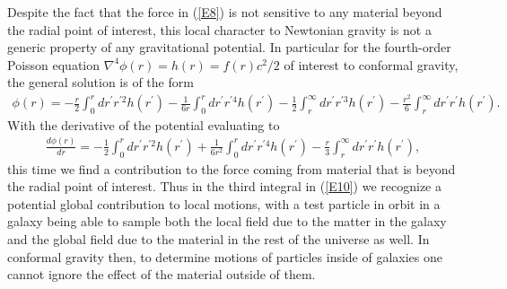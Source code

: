 \documentclass[preprint,aps]{revtex4}
\begin{document}
Despite the fact that the force in (\ref{E8}) is not sensitive to any material beyond the radial point of interest, this local character to Newtonian gravity is not a generic property of any gravitational potential. In particular for the fourth-order Poisson equation $\nabla^4\phi(r)=h(r)=f(r)c^2/2$ of interest to conformal gravity, the general solution is of the form 
%                                                                               
\begin{eqnarray}
\phi(r)= -\frac{r}{2}\int_0^r
dr^{\prime}r^{\prime 2}h(r^{\prime})
-\frac{1}{6r}\int_0^r
dr^{\prime}r^{\prime 4}h(r^{\prime})
-\frac{1}{2}\int_r^{\infty}
dr^{\prime}r^{\prime 3}h(r^{\prime})
-\frac{r^2}{6}\int_r^{\infty}
dr^{\prime}r^{\prime }h(r^{\prime}).
\label{E9}
\end{eqnarray}                                 
%
With the derivative of the potential evaluating to 
%                                                                               
\begin{eqnarray}
\frac{d\phi(r)}{dr}= -\frac{1}{2}\int_0^r
dr^{\prime}r^{\prime 2}h(r^{\prime})
+\frac{1}{6r^2}\int_0^r
dr^{\prime}r^{\prime 4}h(r^{\prime})
-\frac{r}{3}\int_r^{\infty}
dr^{\prime}r^{\prime }h(r^{\prime}),
\label{E10}
\end{eqnarray}                                 
%
this time we find a contribution to the force coming from material that is beyond the radial point of interest. Thus in the third integral in (\ref{E10}) we recognize a potential global contribution to local motions, with a test particle in orbit in a galaxy being able to sample both the local field due to the matter in the galaxy and the global field due to the material in the rest of the universe as well. In conformal gravity then, to determine motions of particles inside of galaxies one cannot ignore the effect of the material outside of them.
\end{document}

